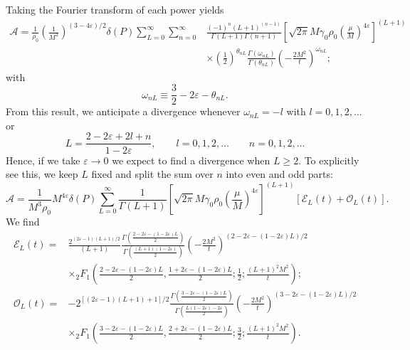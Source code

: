 Taking the Fourier transform of each power yields
\begin{equation}
\begin{split}
	\mathcal{A} = \frac{1}{\rho_{0}} \left( \frac{1}{M^{2}} \right)^{(3 - 4\varepsilon)/2} \delta(P) \sum_{L = 0}^{\infty} \sum_{n = 0}^{\infty} {}& \frac{(-1)^{n}(L+1)^{(n - 1)}}{\Gamma(L + 1) \Gamma(n+1)} \left[ \sqrt{2 \pi} M \gamma_{0} \rho_{0} \left( \frac{\mu}{M} \right)^{4\varepsilon} \right]^{(L+1)} \\
	&\times \left(\frac{1}{2}\right)^{\theta_{nL}} \frac{\Gamma(\omega_{nL})}{\Gamma(\theta_{nL})} \left( - \frac{2M^{2}}{t} \right)^{\omega_{nL}};
\end{split}
\end{equation}
with
\begin{equation}
	\omega_{nL} \equiv \frac{3}{2} - 2\varepsilon - \theta_{nL}.
\end{equation}
From this result, we anticipate a divergence whenever $\omega_{nL} = -l$ with $l = 0,1,2, \ldots$ or
\begin{equation}
	L = \frac{2 - 2\varepsilon + 2 l + n}{1 - 2\varepsilon}, \qquad l = 0, 1, 2, \ldots \qquad n = 0, 1, 2, \ldots
\end{equation}
Hence, if we take $\varepsilon \rightarrow 0$ we expect to find a divergence when $L \geq 2 $. To explicitly see this, we keep $L$ fixed and split the sum over $n$ into even and odd parts:
\begin{equation}
	\mathcal{A} = \frac{1}{M^{3}\rho_{0}} M^{4\varepsilon} \delta(P) \sum_{L = 0}^{\infty} \frac{1}{\Gamma(L + 1)} \left[ \sqrt{2 \pi} M \gamma_{0} \rho_{0} \left( \frac{\mu}{M} \right)^{4\varepsilon} \right]^{(L+1)} [\mathcal{E}_{L}(t) + \mathcal{O}_{L}(t)].
\end{equation}
We find
\begin{align}
	\mathcal{E}_{L}(t) = {}& \frac{2^{(2 \varepsilon - 1)(L + 1)/2}}{(L + 1)} \frac{\Gamma\left( \frac{2 - 2\varepsilon - (1 - 2\varepsilon) L}{2} \right)}{\Gamma\left( \frac{(L + 1)(1 - 2\varepsilon)}{2} \right)} \left( - \frac{2M^{2}}{t} \right)^{(2 - 2\varepsilon - (1 - 2\varepsilon)L)/2} \nonumber \\
	&\times {}_{2}F_{1}\left( \frac{2 - 2\varepsilon - (1 - 2\varepsilon)L}{2}, \frac{1 + 2\varepsilon - (1 - 2\varepsilon)L}{2}; \frac{1}{2}; \frac{(L+1)^{2}M^{2}}{t} \right); \\
	\mathcal{O}_{L}(t) = {}& - 2^{[(2 \varepsilon - 1)(L + 1) + 1]/2} \frac{\Gamma\left( \frac{3 - 2\varepsilon - (1 - 2\varepsilon)L}{2} \right)}{\Gamma \left( \frac{L(1 - 2\varepsilon) - 2\varepsilon}{2} \right)} \left( - \frac{2M^{2}}{t} \right)^{(3 - 2\varepsilon - (1 - 2\varepsilon)L)/2} \nonumber \\
	&\times {}_{2}F_{1}\left( \frac{3 - 2\varepsilon - (1 - 2\varepsilon)L}{2}, \frac{2 + 2\varepsilon - (1 - 2\varepsilon)L}{2}; \frac{3}{2}; \frac{(L+1)^{2}M^{2}}{t} \right).
\end{align}
